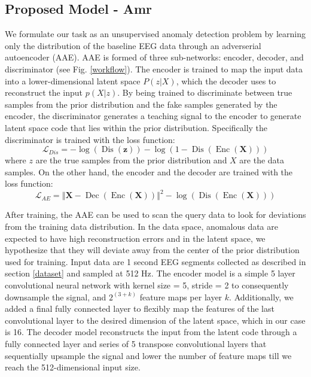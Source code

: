 \documentclass[pmlr]{jmlr}%
\begin{document}
\subsection{Proposed Model - Amr}
We formulate our task as an unsupervised anomaly detection problem by learning only the distribution of the baseline EEG data through an adverserial autoencoder (AAE). AAE is formed of three sub-networks: encoder, decoder, and discriminator (see Fig. \ref{workflow}). The encoder is trained to map the input data into a lower-dimensional latent space $P(z|X)$, which the decoder uses to reconstruct the input $p(X|z)$. By being trained to discriminate between true samples from the prior distribution and the fake samples generated by the encoder, the discriminator generates a teaching signal to the encoder to generate latent space code that lies within the prior distribution. Specifically the discriminator is trained with the loss function:
\begin{equation}
\mathcal{L}_{D i s}=-\log (\operatorname{Dis}(\mathbf{z}))-\log (1-\operatorname{Dis}(\operatorname{Enc}(\mathbf{X})))
\end{equation}
where $z$ are the true samples from the prior distribution and $X$ are the data samples. On the other hand, the encoder and the decoder are trained with the loss function:
\begin{equation}
\mathcal{L}_{AE}= \left\Vert \mathbf{X} - \operatorname{Dec}(\operatorname{Enc}(\mathbf{X})) \right\Vert^2 -\log (\operatorname{Dis}(\operatorname{Enc}(\mathbf{X})))
\end{equation}

After training, the AAE can be used to scan the query data to look for deviations from the training data distribution. In the data space, anomalous data are expected to have high reconstruction errors and in the latent space, we hypothesize that they will deviate away from the center of the prior distribution used for training.
Input data are 1 second EEG segments collected as described in section \ref{dataset} and sampled at 512 Hz. The encoder model is a simple 5 layer convolutional neural network with kernel size = 5, stride = 2 to consequently downsample the signal, and $2^{(3+k)}$ feature maps per layer $k$. Additionally, we added a final fully connected layer to flexibly map the features of the last convolutional layer to the desired dimension of the latent space, which in our case is 16. The decoder model reconstructs the input from the latent code through a fully connected layer and series of 5 transpose convolutional layers that sequentially upsample the signal and lower the number of feature maps till we reach the 512-dimensional input size.   
\end{document}
